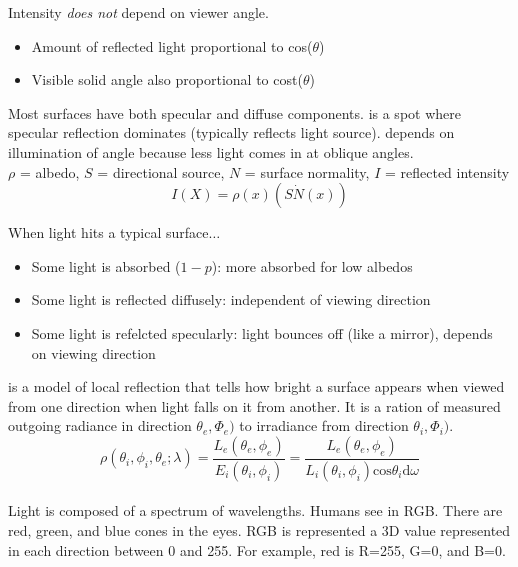 \documentclass{article}
\begin{document}
\begin{definition}
  Intensity \emph{does not} depend on viewer angle. 
  \begin{itemize}
    \item Amount of reflected light proportional to cos($\theta$)
    \item Visible solid angle also proportional to cost($\theta$)
  \end{itemize}
\end{definition}

Most surfaces have both specular and diffuse components.  is a spot where specular reflection dominates (typically reflects light source).  depends on illumination of angle because less light comes in at oblique angles. \\ $\rho$ = albedo, $S$ = directional source, $N$ = surface normality, $I$ = reflected intensity $$I(X) = \rho(x)(S \dot N(x))$$

\begin{remark}
  When light hits a typical surface$\dots$ 
  \begin{itemize}
    \item Some light is absorbed ($1-p$): more absorbed for low albedos 
    \item Some light is reflected diffusely: independent of viewing direction 
    \item Some light is refelcted specularly: light bounces off (like a mirror), depends on viewing direction
  \end{itemize}
\end{remark}

 is a model of local reflection that tells how bright a surface appears when viewed from one direction when light falls on it from another. It is a ration of measured outgoing radiance in direction $\theta_e , \Phi_e)$ to irradiance from direction $\theta_i , \Phi_i)$. 
$$\rho(\theta_i , \phi_i , \theta_e ; \lambda) = \frac{L_e (\theta_e , \phi_e)}{E_i (\theta_i , \phi_i)} = \frac{L_e (\theta_e , \phi_e)}{L_i (\theta_i , \phi_i)\textrm{cos}\theta_i \textrm{d}\omega}$$\\ 

Light is composed of a spectrum of wavelengths. Humans see in RGB. There are red, green, and blue cones in the eyes. RGB is represented a 3D value represented in each direction between 0 and 255. For example, red is R=255, G=0, and B=0. 
\end{document}
